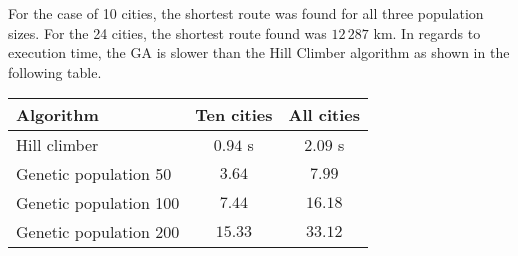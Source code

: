 \documentclass{article}
\begin{document}
For the case of 10 cities, the shortest route was found for all three population sizes. For the 24 cities, the shortest route found was $12\,287$ km. In regards to execution time, the GA is slower than the Hill Climber algorithm as shown in the following table.

\begin{center}
\begin{tabular}{lcc}
\toprule
Algorithm & Ten cities & All cities \\
\midrule
Hill climber & $0.94$ s & $2.09$ s \\
Genetic population 50 & $3.64$ & $7.99$ \\
Genetic population 100 & $7.44$ & $16.18$ \\
Genetic population 200 & $15.33$ & $33.12$ \\
\bottomrule
\end{tabular}
\end{center}
\end{document}
